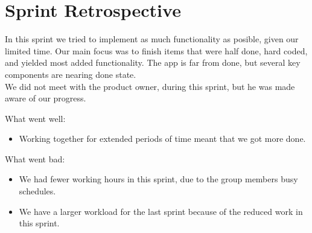 \section{Sprint Retrospective} %
\label{sec:Sprint Retrospective}

In this sprint we tried to implement as much functionality as posible, given our limited time. Our main focus was to finish items that were half done, hard coded, and yielded most added functionality. The app is far from done, but several key components are nearing done state. \\
We did not meet with the product owner, during this sprint, but he was made aware of our progress.

What went well:

\begin{itemize}
	\item Working together for extended periods of time meant that we got more done.

\end{itemize}
What went bad:
\begin{itemize}
	\item We had fewer working hours in this sprint, due to the group members busy schedules.
	\item We have a larger workload for the last sprint because of the reduced work in this sprint.
\end{itemize}
